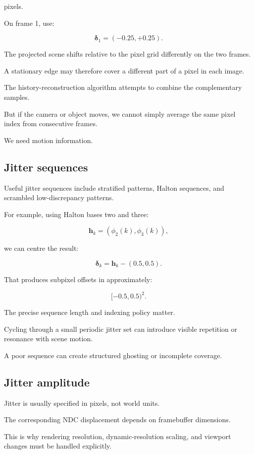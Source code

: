 pixels.

On frame 1, use:

\[
 \boldsymbol\delta_1=(-0.25,+0.25).
\]

The projected scene shifts relative to the pixel grid differently on the two frames.

A stationary edge may therefore cover a different part of a pixel in each image.

The history-reconstruction algorithm attempts to combine the complementary samples.

But if the camera or object moves, we cannot simply average the same pixel index from consecutive frames.

We need motion information.

\subsection{Jitter sequences}\label{02-foundations-ii-ch036-jitter-sequences}

Useful jitter sequences include stratified patterns, Halton sequences, and scrambled low-discrepancy patterns.

For example, using Halton bases two and three:

\[
 \mathbf h_k=(\phi_2(k),\phi_3(k)),
\]

we can centre the result:

\[
 \boxed{ \boldsymbol\delta_k= \mathbf h_k-(0.5,0.5) }.
\]

That produces subpixel offsets in approximately:

\[
 [-0.5,0.5)^2.
\]

The precise sequence length and indexing policy matter.

Cycling through a small periodic jitter set can introduce visible repetition or resonance with scene motion.

A poor sequence can create structured ghosting or incomplete coverage.

\subsection{Jitter amplitude}\label{02-foundations-ii-ch036-jitter-amplitude}

Jitter is usually specified in pixels, not world units.

The corresponding NDC displacement depends on framebuffer dimensions.

This is why rendering resolution, dynamic-resolution scaling, and viewport changes must be handled explicitly.

